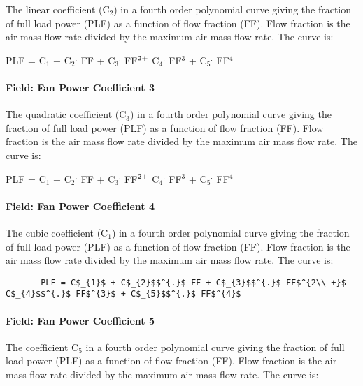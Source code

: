 The linear coefficient (C\(_{2}\)) in a fourth order polynomial curve giving the fraction of full load power (PLF) as a function of flow fraction (FF). Flow fraction is the air mass flow rate divided by the maximum air mass flow rate. The curve is:

PLF = C\(_{1}\) + C\(_{2}\)\(^{.}\) FF + C\(_{3}\)\(^{.}\) FF\(^{2\\ +}\) C\(_{4}\)\(^{.}\) FF\(^{3}\) + C\(_{5}\)\(^{.}\) FF\(^{4}\)

\paragraph{Field: Fan Power Coefficient 3}\label{field-fan-power-coefficient-3}

The quadratic coefficient (C\(_{3}\)) in a fourth order polynomial curve giving the fraction of full load power (PLF) as a function of flow fraction (FF). Flow fraction is the air mass flow rate divided by the maximum air mass flow rate. The curve is:

PLF = C\(_{1}\) + C\(_{2}\)\(^{.}\) FF + C\(_{3}\)\(^{.}\) FF\(^{2\\ +}\) C\(_{4}\)\(^{.}\) FF\(^{3}\) + C\(_{5}\)\(^{.}\) FF\(^{4}\)

\paragraph{Field: Fan Power Coefficient 4}\label{field-fan-power-coefficient-4}

The cubic coefficient (C\(_{1}\)) in a fourth order polynomial curve giving the fraction of full load power (PLF) as a function of flow fraction (FF). Flow fraction is the air mass flow rate divided by the maximum air mass flow rate. The curve is:

\begin{lstlisting}
       PLF = C$_{1}$ + C$_{2}$$^{.}$ FF + C$_{3}$$^{.}$ FF$^{2\\ +}$ C$_{4}$$^{.}$ FF$^{3}$ + C$_{5}$$^{.}$ FF$^{4}$
\end{lstlisting}

\paragraph{Field: Fan Power Coefficient 5}\label{field-fan-power-coefficient-5}

The coefficient C\(_{5}\) in a fourth order polynomial curve giving the fraction of full load power (PLF) as a function of flow fraction (FF). Flow fraction is the air mass flow rate divided by the maximum air mass flow rate. The curve is:

